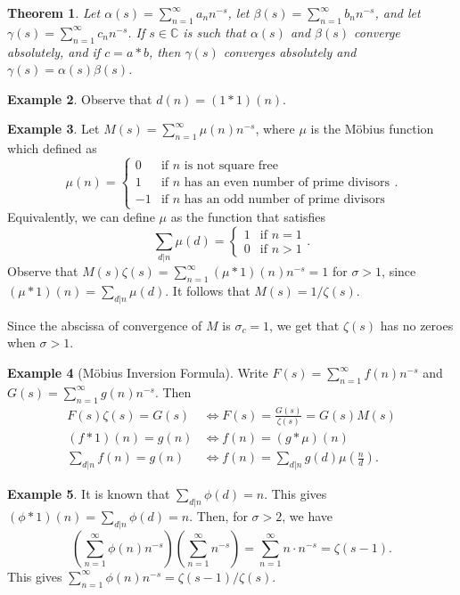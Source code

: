 \documentclass[11pt]{article}
\newtheorem{thm}{Theorem}[subsection]
\theoremstyle{definition}
\newtheorem{example}[thm]{Example}
\newcommand{\s}[0]{\sigma}
\newcommand{\CC}{\mathbb{C}}
\begin{document}
\begin{thm}
Let $\alpha(s)=\sum_{n=1}^\infty a_nn^{-s}$, let $\beta(s)=\sum_{n=1}^\infty b_nn^{-s}$,
and let $\gamma(s)=\sum_{n=1}^\infty c_nn^{-s}$. If $s\in\CC$ is such that $\alpha(s)$ and
$\beta(s)$ converge absolutely, and if $c=a*b$, then $\gamma(s)$ converges absolutely and
$\gamma(s)=\alpha(s)\beta(s)$.
\end{thm}

\begin{example}
Observe that $d(n)=(1*1)(n)$.
\end{example}

\begin{example}
Let $M(s)=\sum_{n=1}^\infty\mu(n)n^{-s}$, where $\mu$ is the M\"obius function which
defined as
\[
  \mu(n) = \begin{cases}
  0 &\text{if } n \text{ is not square free} \\
  1 &\text{if } n \text{ has an even number of prime divisors} \\
  -1 &\text{if } n \text{ has an odd number of prime divisors}
  \end{cases} .
\]
Equivalently, we can define $\mu$ as the function that satisfies
\[
  \sum_{d|n}\mu(d) = \begin{cases}
  1 &\text{if } n = 1 \\
  0 &\text{if } n > 1
  \end{cases} .
\]
Observe that $M(s)\zeta(s) = \sum_{n=1}^\infty(\mu*1)(n)n^{-s} = 1$ for $\s>1$, since
$(\mu*1)(n)=\sum_{d|n}\mu(d)$. It follows that $M(s)=1/\zeta(s)$.

Since the abscissa of convergence of $M$ is $\s_c=1$, we get that $\zeta(s)$ has no zeroes
when $\s>1$.
\end{example}

\begin{example}[M\"obius Inversion Formula]
Write $F(s)=\sum_{n=1}^\infty f(n)n^{-s}$ and $G(s)=\sum_{n=1}^\infty g(n)n^{-s}$. Then
\begin{align*}
F(s)\zeta(s) = G(s) &\iff F(s) = \frac{G(s)}{\zeta(s)} = G(s)M(s) \\
(f*1)(n) = g(n) &\iff f(n) = (g*\mu)(n) \\
\sum_{d|n} f(n) = g(n) &\iff f(n) = \sum_{d|n} g(d)\mu\left(\frac{n}{d}\right) .
\end{align*}
\end{example}

\begin{example}
It is known that $\sum_{d|n}\phi(d)=n$. This gives $(\phi*1)(n)=\sum_{d|n}\phi(d)=n$. Then,
for $\s>2$, we have
\[
\left(\sum_{n=1}^\infty \phi(n)n^{-s}\right) \left(\sum_{n=1}^\infty n^{-s}\right)
= \sum_{n=1}^\infty n\cdot n^{-s} = \zeta(s-1) .
\]
This gives $\sum_{n=1}^\infty\phi(n)n^{-s}=\zeta(s-1)/\zeta(s)$.
\end{example}
\end{document}
